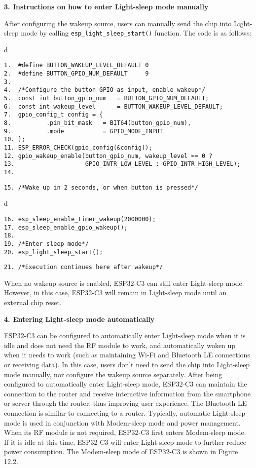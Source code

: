 \documentclass[a4paper,12pt]{book}
\begin{document}
\textbf{3. Instructions on how to enter Light-sleep mode manually}

After configuring the wakeup source, users can manually send the chip into Light-sleep mode by calling \verb|esp_light_sleep_start()| function. The code is as follows:

\begin{codebloc}
\begin{tabular}{d}
\vspace{2pt}
\begin{verbatim}
1.  #define BUTTON_WAKEUP_LEVEL_DEFAULT 0
2.  #define BUTTON_GPIO_NUM_DEFAULT     9
3.
4.  /*Configure the button GPIO as input, enable wakeup*/
5.  const int button_gpio_num   = BUTTON_GPIO_NUM_DEFAULT;
6.  const int wakeup_level      = BUTTON_WAKEUP_LEVEL_DEFAULT;
7.  gpio_config_t config = {
8.          .pin_bit_mask   = BIT64(button_gpio_num),
9.          .mode           = GPIO_MODE_INPUT
10. };
11. ESP_ERROR_CHECK(gpio_config(&config));
12. gpio_wakeup_enable(button_gpio_num, wakeup_level == 0 ?
13.                    GPIO_INTR_LOW_LEVEL : GPIO_INTR_HIGH_LEVEL);
14.
\end{verbatim}
\verb|15. /*Wake up in 2 seconds, or when button is pressed*/|
\end{tabular}
\end{codebloc}

\begin{codebloc}
\begin{tabular}{d}
\vspace{2pt}
\begin{verbatim}
16. esp_sleep_enable_timer_wakeup(2000000);
17. esp_sleep_enable_gpio_wakeup();
18.
19. /*Enter sleep mode*/
20. esp_light_sleep_start();
\end{verbatim}
\verb|21. /*Execution continues here after wakeup*/|
\end{tabular}
\end{codebloc}

When no wakeup source is enabled, ESP32-C3 can still enter Light-sleep mode. However, in this case, ESP32-C3 will remain in Light-sleep mode until an external chip reset.

\textbf{4. Entering Light-sleep mode automatically}

ESP32-C3 can be configured to automatically enter Light-sleep mode when it is idle and does not need the RF module to work, and automatically woken up when it needs to work (such as maintaining Wi-Fi and Bluetooth LE connections or receiving data). In this case, users don’t need to send the chip into Light-sleep mode manually, nor configure the wakeup source separately. After being configured to automatically enter Light-sleep mode, ESP32-C3 can maintain the connection to the router and receive interactive information from the smartphone or server through the router, thus improving user experience. The Bluetooth LE connection is similar to connecting to a router. Typically, automatic Light-sleep mode is used in conjunction with Modem-sleep mode and power management. When its RF module is not required, ESP32-C3 first enters Modem-sleep mode. If it is idle at this time, ESP32-C3 will enter Light-sleep mode to further reduce power consumption. The Modem-sleep mode of ESP32-C3 is shown in Figure 12.2.
\end{document}
